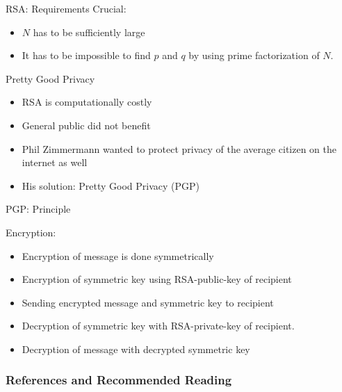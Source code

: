 \documentclass[]{beamer}
\begin{document}
\begin{frame}{RSA: Requirements}
	Crucial: 
	\begin{itemize}
		\item<1-> \(N\) has to be sufficiently large
		\item<2-> It has to be impossible to find \(p\) and \(q\) by using prime factorization of \(N\).
	\end{itemize}
\end{frame}

\begin{frame}{Pretty Good Privacy}
		\begin{itemize}
			\item<1->RSA is computationally costly
			\item<2->General public did not benefit 
			\item<3->Phil Zimmermann wanted to protect privacy of the average citizen on the internet as well
			\item<4->His solution: Pretty Good Privacy (PGP)
		\end{itemize}
\end{frame}

\begin{frame}{PGP: Principle}
	\begin{minipage}[T][5cm][t]{0.45\textwidth}
		Encryption:
		\begin{itemize}
			\item<1->Encryption of message is done symmetrically
			\item<2->Encryption of symmetric key using RSA-public-key of recipient
			\item<3->Sending encrypted message and symmetric key to recipient
		\end{itemize}
	\end{minipage}
	\hfill
	\begin{minipage}[T][5cm][t]{0.45\textwidth}
		\begin{itemize}
			\item<4->Decryption of symmetric key with RSA-private-key of recipient.
			\item<5->Decryption of message with decrypted symmetric key
		\end{itemize}
	\end{minipage}
\end{frame}

\begin{frame}%
	\frametitle{References and Recommended Reading}
	
	
\end{frame}
\end{document}
